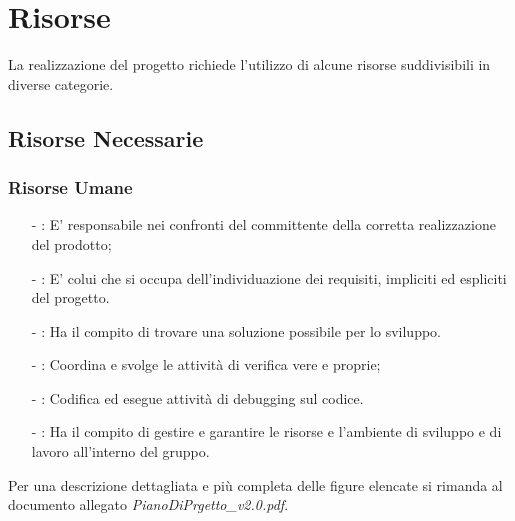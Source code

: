 \section{Risorse} \label{risorse}
La realizzazione del progetto richiede l'utilizzo di alcune risorse suddivisibili in diverse categorie.
\subsection{Risorse Necessarie} 
\subsubsection{Risorse Umane}
\begin{itemize}
	\item[-] \textbf{\ruoloResponsabile}: E' responsabile nei confronti del committente della corretta realizzazione del prodotto;
	\item[-] \textbf{\ruoloAnalista}: E' colui che si occupa dell'individuazione dei requisiti, impliciti ed espliciti del progetto.
	\item[-] \textbf{\ruoloProgettista}: Ha il compito di trovare una soluzione possibile per lo sviluppo.
	\item[-] \textbf{\ruoloVerificatore}: Coordina e svolge le attività di verifica vere e proprie;
	\item[-] \textbf{\ruoloProgrammatore}: Codifica ed esegue attività di debugging sul codice.
	\item[-] \textbf{\ruoloAmministratore}: Ha il compito di gestire e garantire le risorse e l'ambiente di sviluppo e di lavoro all'interno del gruppo.
\end{itemize}
Per una descrizione dettagliata e più completa delle figure elencate si rimanda al documento allegato \textit{PianoDiPrgetto\_v2.0.pdf}.

